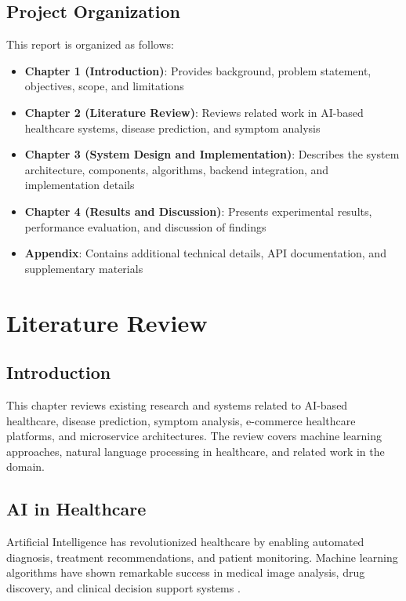 \documentclass[12pt,a4paper]{article}
\begin{document}
\section{Project Organization}
This report is organized as follows:

\begin{itemize}
    \item \textbf{Chapter 1 (Introduction)}: Provides background, problem statement, objectives, scope, and limitations
    \item \textbf{Chapter 2 (Literature Review)}: Reviews related work in AI-based healthcare systems, disease prediction, and symptom analysis
    \item \textbf{Chapter 3 (System Design and Implementation)}: Describes the system architecture, components, algorithms, backend integration, and implementation details
    \item \textbf{Chapter 4 (Results and Discussion)}: Presents experimental results, performance evaluation, and discussion of findings
    \item \textbf{Appendix}: Contains additional technical details, API documentation, and supplementary materials
\end{itemize}


\chapter{Literature Review}
\vspace{0.5cm}

\section{Introduction}
This chapter reviews existing research and systems related to AI-based healthcare, disease prediction, symptom analysis, e-commerce healthcare platforms, and microservice architectures. The review covers machine learning approaches, natural language processing in healthcare, and related work in the domain.

\section{AI in Healthcare}
Artificial Intelligence has revolutionized healthcare by enabling automated diagnosis, treatment recommendations, and patient monitoring. Machine learning algorithms have shown remarkable success in medical image analysis, drug discovery, and clinical decision support systems \cite{topol2019high}.
\end{document}
